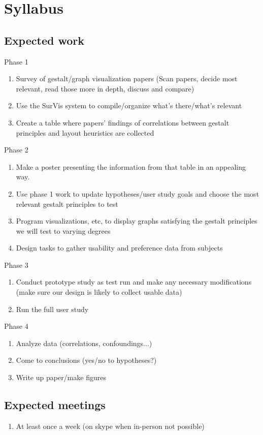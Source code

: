 \documentclass[12pt, twocolumn]{article}
\begin{document}
\newpage
\section{Syllabus}
\subsection{Expected work}
Phase 1
\begin{enumerate}
	\item Survey of gestalt/graph visualization papers (Scan papers, decide most relevant, read those more in depth, discuss and compare)
	\item Use the SurVis system to compile/organize what's there/what's relevant
	\item Create a table where papers' findings of correlations between gestalt principles and layout heuristics are collected
\end{enumerate}
Phase 2
\begin{enumerate}
	\item Make a poster presenting the information from that table in an appealing way.
	\item Use phase 1 work to update hypotheses/user study goals and choose the most relevant gestalt principles to test
	\item Program visualizations, etc, to display graphs satisfying the gestalt principles we will test to varying degrees
	\item Design tasks to gather usability and preference data from subjects
\end{enumerate}
Phase 3
\begin{enumerate}
	\item Conduct prototype study as test run and make any necessary modifications (make sure our design is likely to collect usable data)
	\item Run the full user study
\end{enumerate}
Phase 4
\begin{enumerate}
	\item Analyze data (correlations, confoundings...)
	\item Come to conclusions (yes/no to hypotheses?)
	\item Write up paper/make  figures
\end{enumerate}
\subsection{Expected meetings}
\begin{enumerate}
	\item At least once a week (on skype when in-person not possible)
\end{enumerate}
\end{document}
